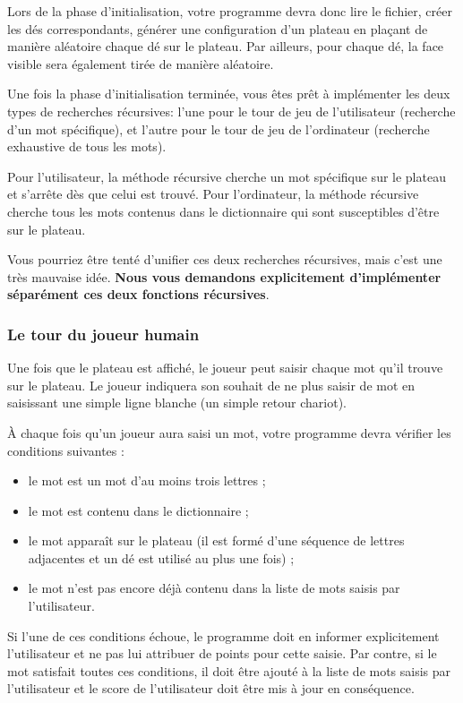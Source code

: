 \documentclass[10pt]{article}
\begin{document}


Lors de la phase d'initialisation, votre programme devra donc lire le
fichier, créer les dés correspondants, générer une configuration d'un plateau
en plaçant de manière aléatoire chaque dé sur le plateau. Par ailleurs, pour
chaque dé, la face visible sera également tirée de manière aléatoire.

Une fois la phase d'initialisation terminée, vous êtes prêt à implémenter les
deux types de recherches récursives: l'une pour le tour de jeu de
l'utilisateur (recherche d'un mot spécifique), et l'autre pour le tour de jeu
de l'ordinateur (recherche exhaustive de tous les mots).

Pour l'utilisateur, la méthode récursive cherche un mot spécifique sur le
plateau et s'arrête dès que celui est trouvé. Pour l'ordinateur, la méthode
récursive cherche tous les mots contenus dans le dictionnaire qui sont
susceptibles d'être sur le plateau.

Vous pourriez être tenté d'unifier ces deux recherches récursives, mais c'est
une très mauvaise idée. {\bf Nous vous demandons explicitement d'implémenter
séparément ces deux fonctions récursives}.


\subsubsection*{Le tour du joueur humain}

Une fois que le plateau est affiché, le joueur peut saisir chaque mot qu'il
trouve sur le plateau. Le joueur indiquera son souhait de ne plus saisir de
mot en saisissant une simple ligne blanche (un simple retour chariot).

\`A chaque fois qu'un joueur aura saisi un mot, votre programme devra
vérifier les conditions suivantes :

\begin{itemize}
 \item le mot est un mot d'au moins trois lettres ;
 \item le mot est contenu dans le dictionnaire ;
 \item le mot apparaît sur le plateau (il est formé d'une séquence de lettres
adjacentes et un dé est utilisé au plus une fois) ;
 \item le mot n'est pas encore déjà contenu dans la liste de mots saisis par
l'utilisateur.
\end{itemize}

Si l'une de ces conditions échoue, le programme doit en informer explicitement
l'utilisateur et ne pas lui attribuer de points pour cette saisie. Par contre,
si le mot satisfait toutes ces conditions, il doit être ajouté à la liste de
mots saisis par l'utilisateur et le score de l'utilisateur doit être mis à
jour en conséquence.
\end{document}
